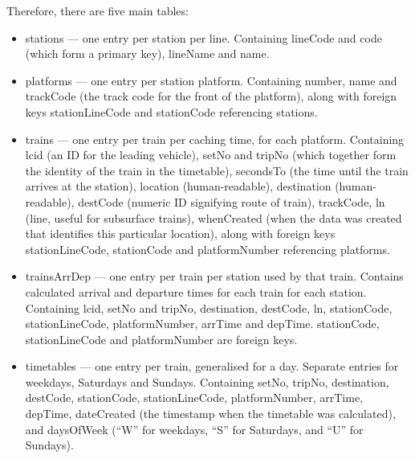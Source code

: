 \documentclass[a4paper,12pt]{report}
\begin{document}
Therefore, there are five main tables:
\begin{itemize}
  \item stations --- one entry per station per line. Containing lineCode and
    code (which form a primary key), lineName and name.
  \item platforms --- one entry per station platform. Containing number, name
    and trackCode (the track code for the front of the platform), along with
    foreign keys stationLineCode and stationCode referencing stations.
  \item trains --- one entry per train per caching time, for each platform.
    Containing lcid (an ID for the leading vehicle), setNo and tripNo (which
    together form the identity of the train in the timetable), secondsTo (the
    time until the train arrives at the station), location (human-readable),
    destination (human-readable), destCode (numeric ID signifying route of
    train), trackCode, ln (line, useful for subsurface trains), whenCreated
    (when the data was created that identifies this particular location), along
    with foreign keys stationLineCode, stationCode and platformNumber
    referencing platforms.
  \item trainsArrDep --- one entry per train per station used by that train.
    Contains calculated arrival and departure times for each train for each
    station. Containing lcid, setNo and tripNo, destination, destCode, ln,
    stationCode, stationLineCode, platformNumber, arrTime and depTime.
    stationCode, stationLineCode and platformNumber are foreign keys.
  \item timetables --- one entry per train, generalised for a day. Separate
    entries for weekdays, Saturdays and Sundays. Containing setNo, tripNo,
    destination, destCode, stationCode, stationLineCode, platformNumber,
    arrTime, depTime, dateCreated (the timestamp when the timetable was
    calculated), and daysOfWeek (``W'' for weekdays, ``S'' for Saturdays, and
    ``U'' for Sundays).
\end{itemize}
\end{document}
